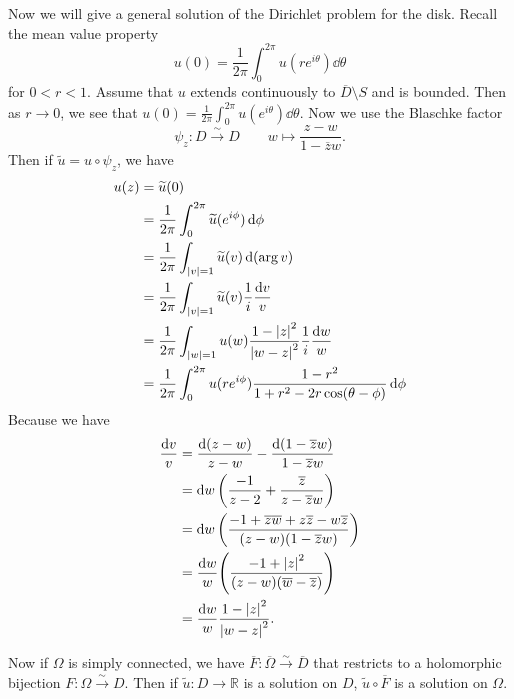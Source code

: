 \documentclass[leqno, openany]{memoir}
\theoremstyle{definition}
\theoremstyle{remark}
\theoremstyle{plain}
\theoremstyle{definition}
\theoremstyle{remark}
\newcommand{\R}{\mathbb{R}}
\newcommand{\ol}[1]{\overline{#1}}
\newcommand{\wt}[1]{\widetilde{#1}}
\begin{document}
Now we will give a general solution of the Dirichlet problem for the disk. Recall the mean value property
\[ u(0) = \frac{1}{2\pi} \int_0^{2\pi} u(re^{i\theta}) \dd{\theta} \]
for $0 < r < 1$. Assume that $u$ extends continuously to $\ol{D} \setminus S$ and is bounded. Then as $r \to 0$, we see that $u(0) = \frac{1}{2\pi} \int_0^{2\pi} u(e^{i\theta}) \dd{\theta}$. Now we use the Blaschke factor 
\[ \psi_z \colon D \xrightarrow{\sim} D \qquad w \mapsto \frac{z-w}{1-\ol{z}w}. \]
Then if $\wt{u} = u \circ \psi_z$, we have
\begin{align*}
    u(z) &= \wt{u}(0) \\
         &= \frac{1}{2\pi} \int_0^{2\pi} \wt{u}(e^{i\phi}) \dd{\phi} \\
         &= \frac{1}{2\pi} \int_{\abs{v}=1} \wt{u}(v) \dd{(\arg v)} \\
         &= \frac{1}{2\pi} \int_{\abs{v}=1} \wt{u}(v) \frac{1}{i} \frac{\dd{v}}{v} \\
         &= \frac{1}{2\pi} \int_{\abs{w}=1} u(w) \frac{1-\abs{z}^2}{\abs{w-z}^2} \frac{1}{i} \frac{\dd{w}}{w} \\
         &= \frac{1}{2\pi} \int_0^{2\pi} u(re^{i\phi}) \frac{1-r^2}{1+r^2-2r\cos(\theta-\phi)} \dd{\phi}
\end{align*}
Because we have
\begin{align*}
    \frac{\dd{v}}{v} &= \frac{\dd{(z-w)}}{z-w} - \frac{\dd{(1-\ol{z}w)}}{1-\ol{z}w} \\
                     &= \dd{w} \qty(\frac{-1}{z-2} + \frac{\ol{z}}{z-\ol{z}w}) \\
                     &= \dd{w} \qty(\frac{{-1 + \ol{z}\ol{w} + z \ol{z} - w \ol{z}}}{(z-w)(1-\ol{z}w)}) \\
                     &= \frac{\dd{w}}{w} \qty(\frac{-1 + \abs{z}^2}{(z-w)(\ol{w}-\ol{z})}) \\
                     &= \frac{\dd{w}}{w} \frac{1-\abs{z}^2}{\abs{w-z}^2}.
\end{align*}

Now if $\Omega$ is simply connected, we have $\ol{F} \colon \ol{\Omega} \xrightarrow{\sim} \ol{D}$ that restricts to a holomorphic bijection $F \colon \Omega \xrightarrow{\sim} D$. Then if $\wt{u} \colon D \to \R$ is a solution on $D$, $\wt{u} \circ \ol{F}$ is a solution on $\Omega$.
\end{document}
